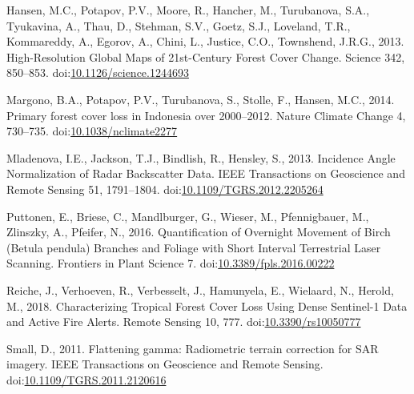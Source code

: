 \documentclass[smallextended]{svjour3}       %
\begin{document}
\leavevmode\hypertarget{ref-Hansen2013}{}%
Hansen, M.C., Potapov, P.V., Moore, R., Hancher, M., Turubanova, S.A.,
Tyukavina, A., Thau, D., Stehman, S.V., Goetz, S.J., Loveland, T.R.,
Kommareddy, A., Egorov, A., Chini, L., Justice, C.O., Townshend, J.R.G.,
2013. High-Resolution Global Maps of 21st-Century Forest Cover Change.
Science 342, 850--853.
doi:\href{https://doi.org/10.1126/science.1244693}{10.1126/science.1244693}

\leavevmode\hypertarget{ref-Margono2014}{}%
Margono, B.A., Potapov, P.V., Turubanova, S., Stolle, F., Hansen, M.C.,
2014. Primary forest cover loss in Indonesia over 2000--2012. Nature
Climate Change 4, 730--735.
doi:\href{https://doi.org/10.1038/nclimate2277}{10.1038/nclimate2277}

\leavevmode\hypertarget{ref-Mladenova2013}{}%
Mladenova, I.E., Jackson, T.J., Bindlish, R., Hensley, S., 2013.
Incidence Angle Normalization of Radar Backscatter Data. IEEE
Transactions on Geoscience and Remote Sensing 51, 1791--1804.
doi:\href{https://doi.org/10.1109/TGRS.2012.2205264}{10.1109/TGRS.2012.2205264}

\leavevmode\hypertarget{ref-Puttonen2016}{}%
Puttonen, E., Briese, C., Mandlburger, G., Wieser, M., Pfennigbauer, M.,
Zlinszky, A., Pfeifer, N., 2016. Quantification of Overnight Movement of
Birch (Betula pendula) Branches and Foliage with Short Interval
Terrestrial Laser Scanning. Frontiers in Plant Science 7.
doi:\href{https://doi.org/10.3389/fpls.2016.00222}{10.3389/fpls.2016.00222}

\leavevmode\hypertarget{ref-Reiche2018}{}%
Reiche, J., Verhoeven, R., Verbesselt, J., Hamunyela, E., Wielaard, N.,
Herold, M., 2018. Characterizing Tropical Forest Cover Loss Using Dense
Sentinel-1 Data and Active Fire Alerts. Remote Sensing 10, 777.
doi:\href{https://doi.org/10.3390/rs10050777}{10.3390/rs10050777}

\leavevmode\hypertarget{ref-Small2011}{}%
Small, D., 2011. Flattening gamma: Radiometric terrain correction for
SAR imagery. IEEE Transactions on Geoscience and Remote Sensing.
doi:\href{https://doi.org/10.1109/TGRS.2011.2120616}{10.1109/TGRS.2011.2120616}



\end{document}
